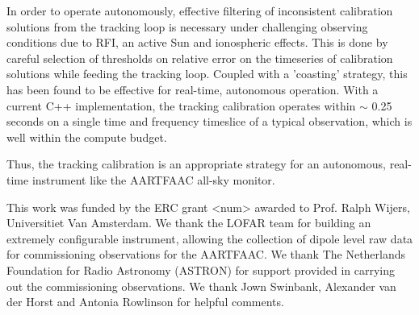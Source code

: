 \documentclass{aa}
\begin{document}
In  order   to  operate   autonomously,  effective  filtering   of  inconsistent
calibration  solutions from  the tracking  loop is  necessary  under challenging
observing conditions due to RFI, an active Sun and ionospheric effects.  This is
done by careful  selection of thresholds on relative error  on the timeseries of
calibration solutions while feeding the tracking loop. Coupled with a 'coasting'
strategy,  this  has  been  found  to be  effective  for  real-time,  autonomous
operation. With a current  C++ implementation, the tracking calibration operates
within $\sim$ 0.25 seconds on a single time and frequency timeslice of a typical
observation, which is well within the compute budget.

Thus, the  tracking calibration  is an appropriate  strategy for  an autonomous,
real-time instrument like the AARTFAAC all-sky monitor.


\begin {acknowledgements}

This work  was funded  by the ERC  grant <num>  awarded to Prof.   Ralph Wijers,
Universitiet Van  Amsterdam. We thank the  LOFAR team for  building an extremely
configurable instrument,  allowing the collection  of dipole level raw  data for
commissioning observations for the AARTFAAC. We thank The Netherlands Foundation
for  Radio  Astronomy  (ASTRON)  for   support  provided  in  carrying  out  the
commissioning observations. We thank Jown  Swinbank, Alexander van der Horst and
Antonia Rowlinson for helpful comments.
\end{acknowledgements}


\end{document}
